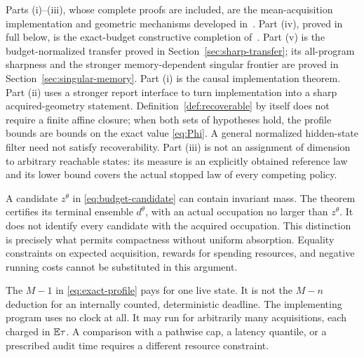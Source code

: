Parts (i)--(iii), whose complete proofs are included, are the mean-acquisition implementation and geometric mechanisms developed in~\cite{GTFMean}. Part (iv), proved in full below, is the exact-budget constructive completion of~\cite{GTFExactBudget}. Part (v) is the budget-normalized transfer proved in Section~\ref{sec:sharp-transfer}; its all-program sharpness and the stronger memory-dependent singular frontier are proved in Section~\ref{sec:singular-memory}. Part (i) is the causal implementation theorem. Part (ii) uses a stronger report interface to turn implementation into a sharp acquired-geometry statement. Definition~\ref{def:recoverable} by itself does not require a finite affine closure; when both sets of hypotheses hold, the profile bounds are bounds on the exact value \eqref{eq:Phi}. A general normalized hidden-state filter need not satisfy recoverability. Part (iii) is not an assignment of dimension to arbitrary reachable states: its measure is an explicitly obtained reference law and its lower bound covers the actual stopped law of every competing policy.

\begin{remark}\label{rem:ghost}
A candidate $z^\theta$ in \eqref{eq:budget-candidate} can contain invariant mass. The theorem certifies its terminal ensemble $d^\theta$, with an actual occupation no larger than $z^\theta$. It does not identify every candidate with the acquired occupation. This distinction is precisely what permits compactness without uniform absorption. Equality constraints on expected acquisition, rewards for spending resources, and negative running costs cannot be substituted in this argument.
\end{remark}

\begin{remark}
The $M-1$ in \eqref{eq:exact-profile} pays for one live state. It is not the $M-n$ deduction for an internally counted, deterministic deadline. The implementing program uses no clock at all. It may run for arbitrarily many acquisitions, each charged in $\mathbb E\tau$. A comparison with a pathwise cap, a latency quantile, or a prescribed audit time requires a different resource constraint.
\end{remark}
